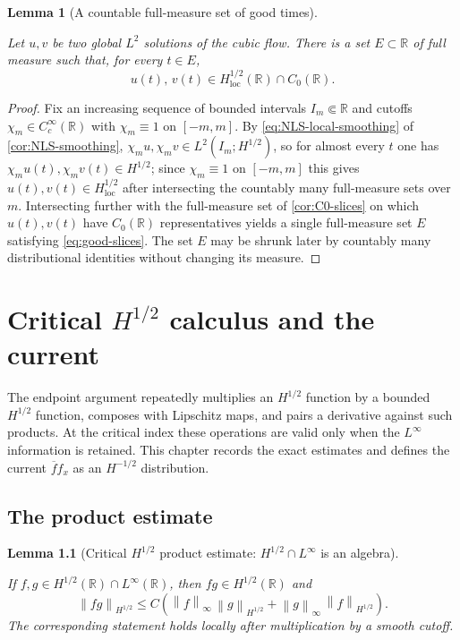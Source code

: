 \documentclass[11pt,oneside]{book}
\providecommand{\uses}[1]{}
\newtheorem{lemma}[theorem]{Lemma}
\theoremstyle{definition}
\theoremstyle{remark}
\newcommand{\R}{\mathbb R}
\newcommand{\1}{\mathbf 1}
\newcommand{\loc}{\mathrm{loc}}
\newcommand{\norm}[1]{\left\lVert #1\right\rVert}
\begin{document}
\begin{lemma}[A countable full-measure set of good times]\label{lem:countable-full-measure}
\uses{cor:NLS-smoothing, cor:C0-slices, def:Hs-loc}
Let $u,v$ be two global $L^2$ solutions of the cubic flow. There is a set
$E\subset\R$ of full measure such that, for every $t\in E$,
\begin{equation}
 u(t),\,v(t)\in H^{1/2}_{\loc}(\R)\cap C_0(\R).
 \label{eq:good-slices}
\end{equation}
\end{lemma}

\begin{proof}
\uses{cor:NLS-smoothing, cor:C0-slices}
Fix an increasing sequence of bounded intervals $I_m\Subset\R$ and cutoffs
$\chi_m\in C_c^\infty(\R)$ with $\chi_m\equiv1$ on $[-m,m]$. By
\eqref{eq:NLS-local-smoothing} of \cref{cor:NLS-smoothing},
$\chi_m u,\chi_m v\in L^2(I_m;H^{1/2})$, so for almost every $t$ one has
$\chi_m u(t),\chi_m v(t)\in H^{1/2}$; since $\chi_m\equiv1$ on $[-m,m]$ this
gives $u(t),v(t)\in H^{1/2}_{\loc}$ after intersecting the countably many
full-measure sets over $m$. Intersecting further with the full-measure set of
\cref{cor:C0-slices} on which $u(t),v(t)$ have $C_0(\R)$ representatives yields a
single full-measure set $E$ satisfying \eqref{eq:good-slices}. The set $E$ may be
shrunk later by countably many distributional identities without changing its
measure.
\end{proof}


\chapter{Critical $H^{1/2}$ calculus and the current}\label{chap:critical-calculus}

The endpoint argument repeatedly multiplies an $H^{1/2}$ function by a bounded $H^{1/2}$ function, composes with Lipschitz maps, and pairs a derivative against such products. At the critical index these operations are valid only when the $L^\infty$ information is retained. This chapter records the exact estimates and defines the current $\overline f f_x$ as an $H^{-1/2}$ distribution.

\section{The product estimate}

\begin{lemma}[Critical $H^{1/2}$ product estimate: $H^{1/2}\cap L^\infty$ is an algebra]\label{lem:gagliardo-product}
\uses{def:Hs-space}
If $f,g\in H^{1/2}(\R)\cap L^\infty(\R)$, then $fg\in H^{1/2}(\R)$ and
\begin{equation}
 \norm{fg}_{H^{1/2}}
 \le C\left(\norm{f}_{\infty}\,\norm{g}_{H^{1/2}}
           +\norm{g}_{\infty}\,\norm{f}_{H^{1/2}}\right).
 \label{eq:Hhalf-product}
\end{equation}
The corresponding statement holds locally after multiplication by a smooth cutoff.
\end{lemma}
\end{document}
